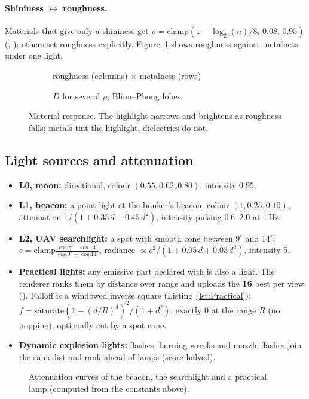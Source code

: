 \paragraph{Shininess $\leftrightarrow$ roughness.} Materials that give only a shininess get $\rho=\mathrm{clamp}(1-\log_2(n)/8,\,0.08,\,0.95)$ (, ); others set roughness explicitly. Figure~\ref{fig:matgrid} shows roughness against metalness under one light.
\begin{figure}[h]
\centering
\begin{subfigure}{0.58\linewidth}\caption{roughness (columns) $\times$ metalness (rows)}\end{subfigure}
\begin{subfigure}{0.40\linewidth}\caption{$D$ for several $\rho$; Blinn--Phong lobes}\end{subfigure}
\caption{Material response. The highlight narrows and brightens as roughness falls; metals tint the highlight, dielectrics do not.}\label{fig:matgrid}
\end{figure}

\subsection{Light sources and attenuation}
\begin{itemize}
  \item \textbf{L0, moon:} directional, colour $(0.55,0.62,0.80)$, intensity 0.95.
  \item \textbf{L1, beacon:} a point light at the bunker's beacon, colour $(1,0.25,0.10)$, attenuation $1/(1+0.35\,d+0.45\,d^2)$, intensity pulsing $0.6$--$2.0$ at 1\,Hz.
  \item \textbf{L2, UAV searchlight:} a spot with smooth cone between $9^\circ$ and $14^\circ$: $c=\mathrm{clamp}\frac{\cos\gamma-\cos14^\circ}{\cos9^\circ-\cos14^\circ}$, radiance $\propto c^2/(1+0.05\,d+0.03\,d^2)$, intensity 5.
  \item \textbf{Practical lights:} any emissive part declared with  is also a light. The renderer ranks them by distance over range and uploads the \textbf{16} best per view (). Falloff is a windowed inverse square (Listing~\ref{lst:Practical}): $f=\mathrm{saturate}(1-(d/R)^4)^2/(1+d^2)$, exactly 0 at the range $R$ (no popping), optionally cut by a spot cone.
  \item \textbf{Dynamic explosion lights:} flashes, burning wrecks and muzzle flashes join the same list and rank ahead of lamps (score halved).
\end{itemize}
\lstPractical
\begin{figure}[h]
\centering
{}
\caption{Attenuation curves of the beacon, the searchlight and a practical lamp (computed from the constants above).}
\end{figure}


